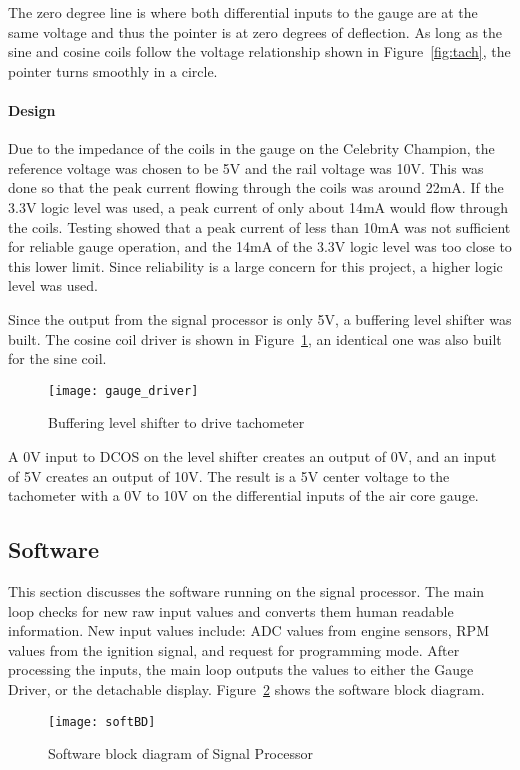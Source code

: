 The zero degree line is where both differential inputs to the gauge are at the same voltage and thus the pointer is at zero degrees of deflection. As long as the sine and cosine coils follow the voltage relationship shown in Figure~\ref{fig:tach}, the pointer turns smoothly in a circle.
\paragraph{Design}
Due to the impedance of the coils in the gauge on the Celebrity Champion, the reference voltage was chosen to be 5V and the rail voltage was 10V. This was done so that the peak current flowing through the coils was around 22mA. If the 3.3V logic level was used, a peak current of only about 14mA would flow through the coils. Testing showed that a peak current of less than 10mA was not sufficient for reliable gauge operation, and the 14mA of the 3.3V logic level was too close to this lower limit. Since reliability is a large concern for this project, a higher logic level was used.

Since the output from the signal processor is only 5V, a buffering level shifter was built. The cosine coil driver is shown in Figure~\ref{fig:buflevel}, an identical one was also built for the sine coil. 

\begin{figure}[H]
    \centering
    \texttt{[image: gauge\_driver]}
    \caption{Buffering level shifter to drive tachometer}
    \label{fig:buflevel}
\end{figure}


A 0V input to DCOS on the level shifter creates an output of 0V, and an input of 5V creates an output of 10V. The result is a 5V center voltage to the tachometer with a 0V to 10V on the differential inputs of the air core gauge.

\subsection{Software}
This section discusses the software running on the signal processor.
The main loop checks for new raw input values and converts them human readable information. New input values include: ADC values from engine sensors, RPM values from the ignition signal, and request for programming mode. After processing the inputs, the main loop outputs the values to either the Gauge Driver, or the detachable display. Figure~\ref{fig:softbd} shows the software block diagram.
\begin{figure}[H]
    \centering
    \texttt{[image: softBD]}
    \caption{Software block diagram of Signal Processor}
    \label{fig:softbd}
\end{figure}

